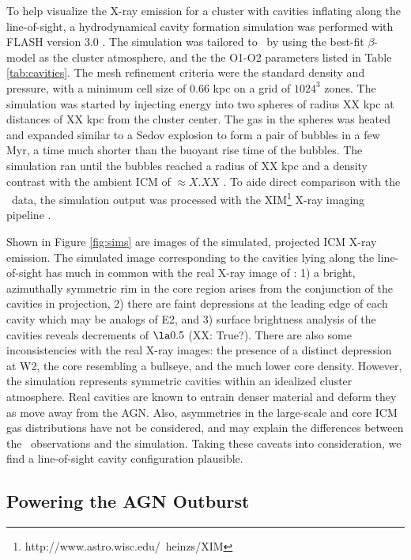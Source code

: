 \documentclass[11pt, preprint]{aastex}
\begin{document}
To help visualize the X-ray emission for a cluster with cavities
inflating along the line-of-sight, a hydrodynamical cavity formation
simulation was performed with {\textsc{FLASH}} version 3.0
\citep{flash}. The simulation was tailored to \rbs\ by using the
best-fit $\beta$-model as the cluster atmosphere, and the the O1-O2
parameters listed in Table \ref{tab:cavities}. The mesh refinement
criteria were the standard density and pressure, with a minimum cell
size of 0.66 kpc on a grid of $1024^3$ zones. The simulation was
started by injecting energy into two spheres of radius XX kpc at
distances of XX kpc from the cluster center. The gas in the spheres
was heated and expanded similar to a Sedov explosion to form a pair of
bubbles in a few Myr, a time much shorter than the buoyant rise time
of the bubbles. The simulation ran until the bubbles reached a radius
of XX kpc and a density contrast with the ambient ICM of $\approx
X.XX$ \citep[see][]{2009arXiv0909.1805S}. To aide direct comparison
with the \cxo\ data, the simulation output was processed with the
{\textsc{XIM}}\footnote{http://www.astro.wisc.edu/~heinzs/XIM} X-ray
imaging pipeline \citep{2009arXiv0903.0043H}.

Shown in Figure \ref{fig:sims} are images of the simulated, projected
ICM X-ray emission. The simulated image corresponding to the cavities
lying along the line-of-sight has much in common with the real X-ray
image of \rbs: 1) a bright, azimuthally symmetric rim in the core
region arises from the conjunction of the cavities in projection, 2)
there are faint depressions at the leading edge of each cavity which
may be analogs of E2, and 3) surface brightness analysis of the
cavities reveals decrements of $\la 0.5$ (XX: True?). There are also
some inconsistencies with the real X-ray images: the presence of a
distinct depression at W2, the core resembling a bullseye, and the
much lower core density. However, the simulation represents symmetric
cavities within an idealized cluster atmosphere. Real cavities are
known to entrain denser material and deform they as move away from the
AGN. Also, asymmetries in the large-scale and core ICM gas
distributions have not be considered, and may explain the differences
between the \cxo\ observations and the simulation. Taking these
caveats into consideration, we find a line-of-sight cavity
configuration plausible.

\subsection{Powering the AGN Outburst}
\label{sec:accretion}
\end{document}
